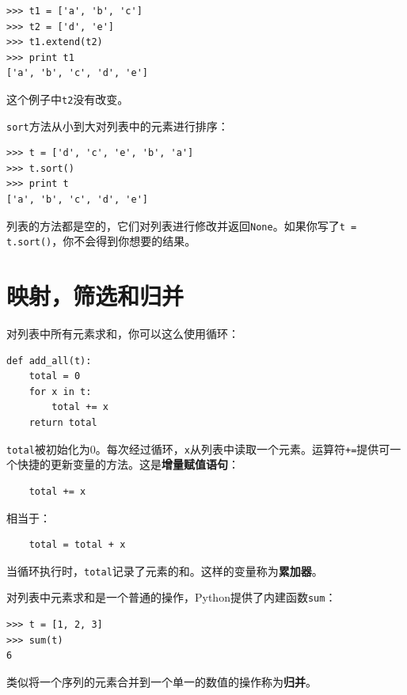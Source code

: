\beforeverb
\begin{verbatim}
>>> t1 = ['a', 'b', 'c']
>>> t2 = ['d', 'e']
>>> t1.extend(t2)
>>> print t1
['a', 'b', 'c', 'd', 'e']
\end{verbatim}
\afterverb
%
这个例子中{\tt t2}没有改变。

{\tt sort}方法从小到大对列表中的元素进行排序：


\beforeverb
\begin{verbatim}
>>> t = ['d', 'c', 'e', 'b', 'a']
>>> t.sort()
>>> print t
['a', 'b', 'c', 'd', 'e']
\end{verbatim}
\afterverb
%
列表的方法都是空的，它们对列表进行修改并返回{\tt None}。如果你写了{\tt t = t.sort()}，你不会得到你想要的结果。



\section{映射，筛选和归并}

对列表中所有元素求和，你可以这么使用循环：


\beforeverb
\begin{verbatim}
def add_all(t):
    total = 0
    for x in t:
        total += x
    return total
\end{verbatim}
\afterverb
%
{\tt total}被初始化为0。每次经过循环，{\tt x}从列表中读取一个元素。运算符{\tt +=}提供可一个快捷的更新变量的方法。这是{\bf 增量赋值语句}：



\beforeverb
\begin{verbatim}
    total += x
\end{verbatim}
\afterverb
%
相当于：

\beforeverb
\begin{verbatim}
    total = total + x
\end{verbatim}
\afterverb
%
当循环执行时，{\tt total}记录了元素的和。这样的变量称为{\bf 累加器}。


对列表中元素求和是一个普通的操作，Python提供了内建函数{\tt sum}：

\beforeverb
\begin{verbatim}
>>> t = [1, 2, 3]
>>> sum(t)
6
\end{verbatim}
\afterverb
%
类似将一个序列的元素合并到一个单一的数值的操作称为{\bf 归并}。

